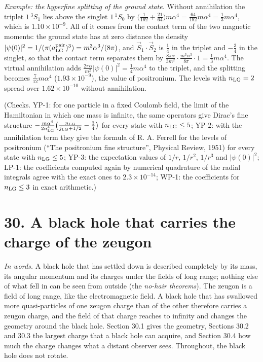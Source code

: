 \documentclass[
  10pt,
]{article}
\begin{document}
\emph{Example: the hyperfine splitting of the ground state.} Without
annihilation the triplet \(1\,{}^3S_1\) lies above the singlet
\(1\,{}^1S_0\) by
\(\big(\tfrac1{192}+\tfrac{21}{64}\big)m\alpha^4=\tfrac{64}{192}m\alpha^4=\tfrac13m\alpha^4\),
which is \(1.10\times10^{-9}\). All of it comes from the contact term of
the two magnetic moments: the ground state has at zero distance the
density
\(\lvert\psi(0)\rvert^2=1/(\pi(a^{\rm pair}_{\rm LG})^3)=m^3\alpha^3/(8\pi)\),
and \(\vec S_1\cdot\vec S_2\) is \(\tfrac14\) in the triplet and
\(-\tfrac34\) in the singlet, so that the contact term separates them by
\(\frac{8\pi\alpha}{3m^2}\cdot\frac{m^3\alpha^3}{8\pi}\cdot1=\tfrac13m\alpha^4\).
The virtual annihilation adds
\(\frac{2\pi\alpha}{m^2}\lvert\psi(0)\rvert^2=\tfrac14m\alpha^4\) to the
triplet, and the splitting becomes \(\tfrac7{12}m\alpha^4\)
(\(1.93\times10^{-9}\)), the value of positronium. The levels with
\(n_{\rm LG}=2\) spread over \(1.62\times10^{-10}\) without
annihilation.

(Checks. YP-1: for one particle in a fixed Coulomb field, the limit of
the Hamiltonian in which one mass is infinite, the same operators give
Dirac's fine structure
\(-\frac{m\alpha^4}{2n_{\rm LG}^4}\big(\frac{n_{\rm LG}}{j_{\rm LG}+1/2}-\frac34\big)\)
for every state with \(n_{\rm LG}\le5\); YP-2: with the annihilation
term they give the formula of R. A. Ferrell for the levels of
positronium (``The positronium fine structure'', Physical Review, 1951)
for every state with \(n_{\rm LG}\le5\); YP-3: the expectation values of
\(1/r\), \(1/r^2\), \(1/r^3\) and \(\lvert\psi(0)\rvert^2\); LP-1: the
coefficients computed again by numerical quadrature of the radial
integrals agree with the exact ones to \(2.3\times10^{-14}\); WP-1: the
coefficients for \(n_{\rm LG}\le3\) in exact arithmetic.)

\hypertarget{a-black-hole-that-carries-the-charge-of-the-zeugon}{%
\section{30. A black hole that carries the charge of the
zeugon}\label{a-black-hole-that-carries-the-charge-of-the-zeugon}}

\emph{In words.} A black hole that has settled down is described
completely by its mass, its angular momentum and its charges under the
fields of long range; nothing else of what fell in can be seen from
outside (the \emph{no-hair theorems}). The zeugon is a field of long
range, like the electromagnetic field. A black hole that has swallowed
more quasi-particles of one zeugon charge than of the other therefore
carries a zeugon charge, and the field of that charge reaches to
infinity and changes the geometry around the black hole. Section 30.1
gives the geometry, Sections 30.2 and 30.3 the largest charge that a
black hole can acquire, and Section 30.4 how much the charge changes
what a distant observer sees. Throughout, the black hole does not
rotate.
\end{document}
